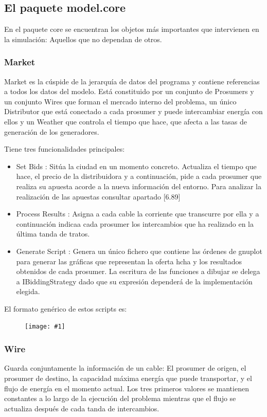 \documentclass[12pt,a4paper,openright,oneside]{article}
\newcommand{\includeImage}[1]
{
	\begin{figure}[htb]
	\begin{center}
	\texttt{[image: \#1]}
	\end{center}
	\end{figure}
}
\numberwithin{equation}{section}
\theoremstyle{definition}
\begin{document}
\subsection{El paquete model.core}
En el paquete core se encuentran los objetos más importantes que intervienen en la simulación: Aquellos que no dependan de otros.
\subsubsection{Market}
Market es la cúspide de la jerarquía de datos del programa y contiene referencias a todos los datos del modelo. Está constituido por un conjunto de Prosumers y un conjunto Wires que forman el mercado interno del problema, un único Distributor que está conectado a cada prosumer y puede intercambiar energía con ellos y un Weather que controla el tiempo que hace, que afecta a las tasas de generación de los generadores.

Tiene tres funcionalidades principales:
\begin{itemize}
\item Set Bids : Sitúa la ciudad en un momento concreto. Actualiza el tiempo que hace, el precio de la distribuidora y a continuación, pide a cada prosumer que realiza su apuesta acorde a la nueva información del entorno. Para analizar la realización de las apuestas consultar apartado [6.89]
\item Process Results : Asigna a cada cable la corriente que transcurre por ella y a continuación indicaa cada prosumer los intercambios que ha realizado en la última tanda de tratos.
\item Generate Script : Genera un único fichero que contiene las órdenes de gnuplot para generar las gráficas que representan la oferta hcha y los resultados obtenidos de cada prosumer. La escritura de las funciones a dibujar se delega a IBiddingStrategy dado que su expresión dependerá de la implementación elegida. 
\end{itemize}
El formato genérico de estos scripts es:
\includeImage{formato_script.png}

\subsubsection{Wire}

Guarda conjuntamente la información de un cable: El prosumer de origen, el prosumer de destino, la capacidad máxima energía que puede transportar, y el flujo de energía en el momento actual. Los tres primeros valores se mantienen constantes a lo largo de la ejecución del problema mientras que el flujo se actualiza después de cada tanda de intercambios.
\end{document}
